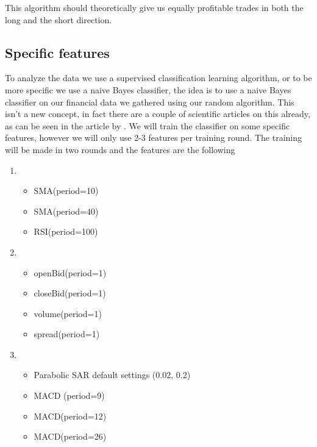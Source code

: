 \documentclass[10pt]{IEEEtran}
\begin{document}
This algorithm should theoretically give us equally profitable trades in both the long and the short direction.

\subsection{Specific features}
To analyze the data we use a supervised classification learning algorithm, or to be more specific we use a naive Bayes classifier, the idea is to use a naive Bayes classifier on our financial data we gathered using our random algorithm. This isn't a new concept, in fact there are a couple of scientific articles on this already, as can be seen in the article by \cite{fxNaiveBayes}. We will train the classifier on some specific features, however we will only use 2-3 features per training round. The training will be made in two rounds and the features are the following
\begin{enumerate}
\item{
	\begin{itemize}
		\item{SMA(period=10)}
		\item{SMA(period=40)}
		\item{RSI(period=100)}
	\end{itemize}
}
\item{
	\begin{itemize}
		\item{openBid(period=1)}
		\item{closeBid(period=1)}
		\item{volume(period=1)}
		\item{spread(period=1)}
	\end{itemize}
}
\item{
	\begin{itemize}
		\item{Parabolic SAR default settings (0.02, 0.2)}
		\item{MACD (period=9)}
		\item{MACD(period=12)}
		\item{MACD(period=26)}		
	\end{itemize}
}
\end{enumerate}
\end{document}
